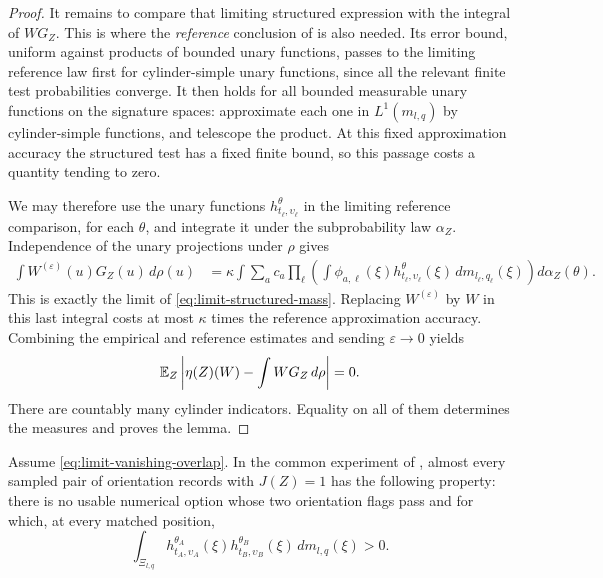 \begin{proof}
It remains to compare that limiting structured expression with the
integral of $W G_Z$. This is where the \emph{reference} conclusion of
 is also needed. Its error bound, uniform against
products of bounded unary functions, passes to the limiting reference
law first for cylinder-simple unary functions, since all the relevant
finite test probabilities converge. It then holds for all bounded
measurable unary functions on the signature spaces: approximate each
one in $L^1(m_{l,q})$ by cylinder-simple functions, and telescope the
product. At this fixed approximation accuracy the structured test has
a fixed finite bound, so this passage costs a quantity tending to zero.

We may therefore use the unary functions
$h^\theta_{t_\ell,\upsilon_\ell}$ in the limiting reference comparison, for
each $\theta$, and integrate it under the subprobability law
$\alpha_Z$. Independence of the unary projections under $\rho$ gives
\begin{align*}
\int W^{(\varepsilon)}(u)G_Z(u)\,d\rho(u)
&=\kappa\int\sum_a c_a
 \prod_\ell\left(
   \int\phi_{a,\ell}(\xi)
                h^\theta_{t_\ell,\upsilon_\ell}(\xi)\,dm_{l_\ell,q_\ell}(\xi)
              \right)d\alpha_Z(\theta).
\end{align*}
This is exactly the limit of \eqref{eq:limit-structured-mass}.
Replacing $W^{(\varepsilon)}$ by $W$ in this last integral costs at most
$\kappa$ times the reference approximation accuracy. Combining the
empirical and reference estimates and sending $\varepsilon\to0$ yields
\[
\mathbb E_Z\left|\eta(Z)(W)-\int W G_Z\,d\rho\right|=0.
\]
There are countably many cylinder indicators. Equality on all of them
determines the measures and proves the lemma.
\end{proof}

\begin{proposition}
\label{prop:limit-overlap}
Assume \eqref{eq:limit-vanishing-overlap}. In the common experiment of
, almost every sampled pair of orientation records
with $J(Z)=1$ has the following property: there is no usable numerical
option whose two orientation flags pass and for which, at every matched position,
\begin{equation}
\label{eq:limit-positive-generator}
\int_{\Xi_{l,q}}
 h^{\theta_A}_{t_A,\upsilon_A}(\xi)
 h^{\theta_B}_{t_B,\upsilon_B}(\xi)\,dm_{l,q}(\xi)>0.
\end{equation}
\end{proposition}

